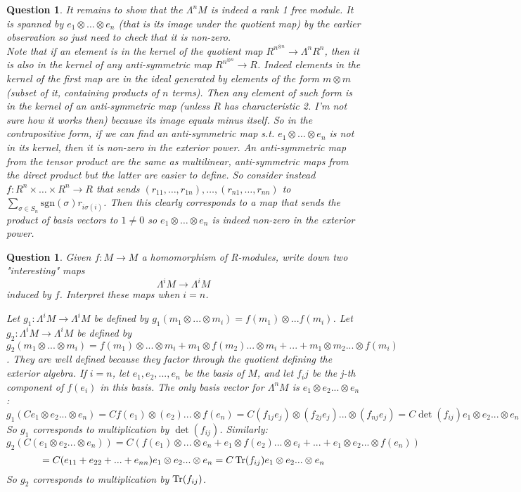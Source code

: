 \documentclass[a4paper]{article}
\newtheorem{que}[thm]{Question}
\begin{document}
\begin{que}
    It remains to show that the $\Lambda^{n}M$ is indeed a rank 1 free module. It is spanned by $e_1\otimes \ldots\otimes e_n$ (that is its image under the quotient map) by the earlier observation so just need to check that it is non-zero. \\Note that if an element is in the kernel of the quotient map $R^{n^{\otimes n}}\to \Lambda^{n}R^{n}$, then it is also in the kernel of any anti-symmetric map $R^{n^{\otimes n}}\to R$. Indeed elements in the kernel of the first map are in the ideal generated by elements of the form $m\otimes m$ (subset of it, containing products of $n$ terms). Then any element of such form is in the kernel of an anti-symmetric map (unless $R$ has characteristic 2. I'm not sure how it works then) because its image equals minus itself. So in the contrapositive form, if we can find an anti-symmetric map s.t. $e_1\otimes \ldots\otimes e_n$ is not in its kernel, then it is non-zero in the exterior power. An anti-symmetric map from the tensor product are the same as multilinear, anti-symmetric maps from the direct product but the latter are easier to define. So consider instead $f:R^{n}\times \ldots\times R^{n}\to R$ that sends $\left( r_{11},\ldots,r_{1n} \right),\ldots,\left(r_{n1},\ldots,r_{nn}\right) $ to $\sum_{\sigma\in S_n}\text{sgn}\left( \sigma \right) r_{i\sigma\left( i \right) }$. Then this clearly corresponds to a map that sends the product of basis vectors to $1\neq 0$ so $e_1\otimes \ldots\otimes e_n$ is indeed non-zero in the exterior power.
\end{que}
\begin{que} Given $f : M \to M$ a homomorphism of R-modules, write down two "interesting" maps
$$\Lambda^i M \to \Lambda^i M$$ induced by $f$. Interpret these maps when $i=n$.

Let $g_1 : \Lambda^i M \to \Lambda^i M$ be defined by $g_1(m_1 \otimes ... \otimes m_i) = f(m_1) \otimes ... f(m_i)$. 
Let $g_2 : \Lambda^i M \to \Lambda^i M$ be defined by $g_2(m_1 \otimes ... \otimes m_i) = f(m_1) \otimes ... \otimes m_i + m_1 \otimes f(m_2) ... \otimes m_i + ... + m_1 \otimes m_2 ... \otimes f(m_i)$. They are well defined because they factor through the quotient defining the exterior algebra.
If $i=n$, let $e_1, e_2, ..., e_n$ be the basis of $M$, and let $f_ij$ be the j-th component of $f(e_i)$ in this basis. The only basis vector for $\Lambda^n M$ is $e_1 \otimes e_2 ... \otimes e_n$:
$$g_1(C e_1 \otimes e_2 ... \otimes e_n) = C f(e_1) \otimes (e_2) ... \otimes f(e_n) = C (f_{1j}e_j) \otimes (f_{2j}e_j) ... \otimes (f_{nj}e_j) = C \det(f_{ij})  e_1 \otimes e_2 ... \otimes e_n$$
So $g_1$ corresponds to multiplication by $\det(f_{ij})$.
Similarly:
$$g_2(C( e_1 \otimes e_2 ... \otimes e_n)) = C(f(e_1) \otimes ... \otimes e_n + e_1 \otimes f(e_2) ... \otimes e_i + ... + e_1 \otimes e_2 ... \otimes f(e_n))$$
$$ = C(e_{11} + e_{22}+...+e_{nn}) e_1 \otimes e_2 ... \otimes e_n = C \operatorname{Tr}(f_{ij}) e_1 \otimes e_2 ... \otimes e_n$$
So $g_2$ corresponds to multiplication by $\operatorname{Tr}(f_{ij})$.
\end{que}
\end{document}
